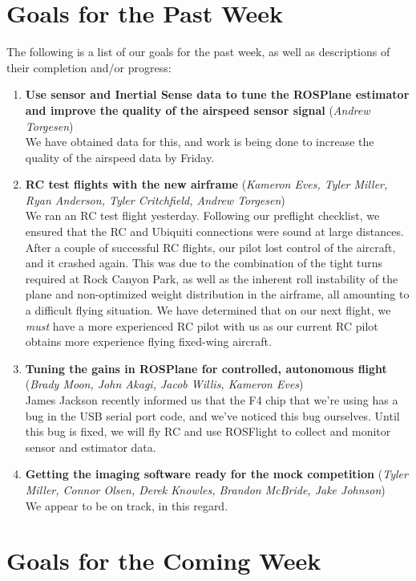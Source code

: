 \documentclass[]{../auvsi_doc}
\begin{document}
\section{Goals for the Past Week}

The following is a list of our goals for the past week, as well as descriptions of their completion and/or progress:

\begin{enumerate}
	\item \textbf{Use sensor and Inertial Sense data to tune the ROSPlane estimator and improve the quality of the airspeed sensor signal} (\textit{Andrew Torgesen})\\
	We have obtained data for this, and work is being done to increase the quality of the airspeed data by Friday.
	\item \textbf{RC test flights with the new airframe} (\textit{Kameron Eves, Tyler Miller, Ryan Anderson, Tyler Critchfield, Andrew Torgesen})\\
	We ran an RC test flight yesterday. Following our preflight checklist, we ensured that the RC and Ubiquiti connections were sound at large distances. After a couple of successful RC flights, our pilot lost control of the aircraft, and it crashed again. This was due to the combination of the tight turns required at Rock Canyon Park, as well as the inherent roll instability of the plane and non-optimized weight distribution in the airframe, all amounting to a difficult flying situation. We have determined that on our next flight, we \textit{must} have a more experienced RC pilot with us as our current RC pilot obtains more experience flying fixed-wing aircraft.
	\item \textbf{Tuning the gains in ROSPlane for controlled, autonomous flight} (\textit{Brady Moon, John Akagi, Jacob Willis, Kameron Eves})\\
	James Jackson recently informed us that the F4 chip that we're using has a bug in the USB serial port code, and we've noticed this bug ourselves. Until this bug is fixed, we will fly RC and use ROSFlight to collect and monitor sensor and estimator data.
	\item \textbf{Getting the imaging software ready for the mock competition} (\textit{Tyler Miller, Connor Olsen, Derek Knowles, Brandon McBride, Jake Johnson})\\
	We appear to be on track, in this regard.
\end{enumerate}

\section{Goals for the Coming Week}
\end{document}
